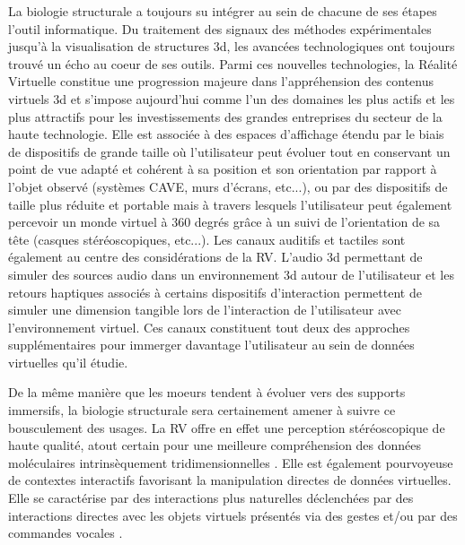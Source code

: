 La biologie structurale a toujours su intégrer au sein de chacune de ses étapes l'outil informatique. Du traitement des signaux des méthodes expérimentales jusqu'à la visualisation de structures 3d, les avancées technologiques ont toujours trouvé un écho au coeur de ses outils.
Parmi ces nouvelles technologies, la Réalité Virtuelle constitue une progression majeure dans l'appréhension des contenus virtuels 3d et s'impose aujourd'hui comme l'un des domaines les plus actifs et les plus attractifs pour les investissements des grandes entreprises du secteur de la haute technologie.
Elle est associée à des espaces d'affichage étendu par le biais de dispositifs de grande taille où l'utilisateur peut évoluer tout en conservant un point de vue adapté et cohérent à sa position et son orientation par rapport à l'objet observé (systèmes CAVE, murs d'écrans, etc...), ou par des dispositifs de taille plus réduite et portable mais à travers lesquels l'utilisateur peut également percevoir un monde virtuel à 360 degrés grâce à un suivi de l'orientation de sa tête (casques stéréoscopiques, etc...). Les canaux auditifs et tactiles sont également au centre des considérations de la RV. L'audio 3d permettant de simuler des sources audio dans un environnement 3d autour de l'utilisateur et les retours haptiques associés à certains dispositifs d'interaction permettent de simuler une dimension tangible lors de l'interaction de l'utilisateur avec l'environnement virtuel. Ces canaux constituent tout deux des approches supplémentaires pour immerger davantage l'utilisateur au sein de données virtuelles qu'il étudie.

De la même manière que les moeurs tendent à évoluer vers des supports immersifs, la biologie structurale sera certainement amener à suivre ce bousculement des usages. 
La RV offre en effet une perception stéréoscopique de haute qualité, atout certain pour une meilleure compréhension des données moléculaires intrinsèquement tridimensionnelles \cite{van2000immersive,stone_immersive_2010,odonoghue_visualization_2010}. Elle est également pourvoyeuse de contextes interactifs favorisant la manipulation directes de données virtuelles. Elle se caractérise par des interactions plus naturelles déclenchées par des interactions directes avec les objets virtuels présentés via des gestes et/ou par des commandes vocales \cite{bowman2001design}.

